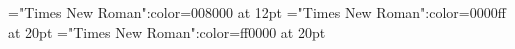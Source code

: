 \font\tctbta="Times New Roman":color=008000 at 12pt
\font\tbta="Times New Roman":color=0000ff at 20pt
\font\ta="Times New Roman":color=ff0000 at 20pt






\bye
